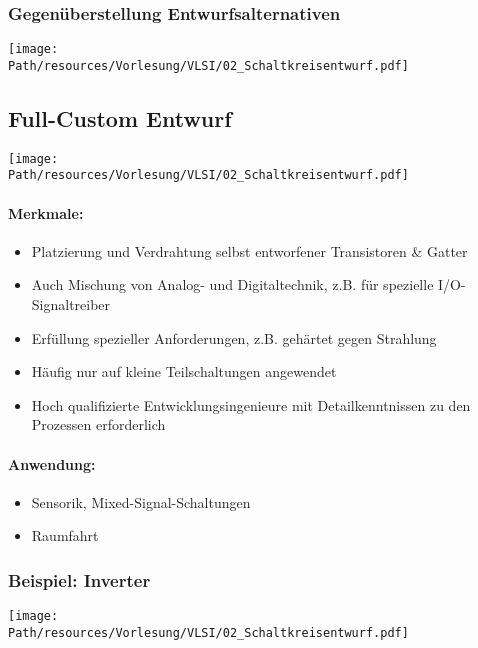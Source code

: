 	\subsubsection{Gegenüberstellung Entwurfsalternativen}
		\begin{center}
			\texttt{[image: \\Path/resources/Vorlesung/VLSI/02\_Schaltkreisentwurf.pdf]}
		\end{center}

\subsection{Full-Custom Entwurf}
	\begin{center}
		\texttt{[image: \\Path/resources/Vorlesung/VLSI/02\_Schaltkreisentwurf.pdf]}
	\end{center}
	\paragraph{Merkmale:}
	\begin{itemize}
		\item Platzierung und Verdrahtung selbst entworfener Transistoren \& Gatter
		\item Auch Mischung von Analog- und Digitaltechnik, z.B. für spezielle I/O-Signaltreiber
		\item Erfüllung spezieller Anforderungen, z.B. gehärtet gegen Strahlung
		\item Häufig nur auf kleine Teilschaltungen angewendet
		\item Hoch qualifizierte Entwicklungsingenieure mit Detailkenntnissen zu den Prozessen erforderlich
	\end{itemize}
	\paragraph{Anwendung:}
	\begin{itemize}
		\item Sensorik, Mixed-Signal-Schaltungen
		\item Raumfahrt
	\end{itemize}
	\subsubsection{Beispiel: Inverter}
		\begin{center}
			\texttt{[image: \\Path/resources/Vorlesung/VLSI/02\_Schaltkreisentwurf.pdf]}
		\end{center}
	
